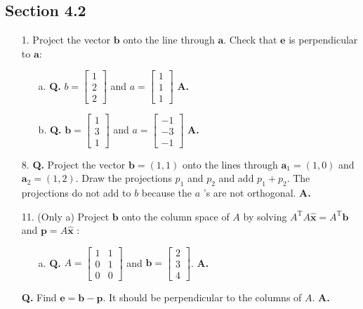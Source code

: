 \documentclass[main.tex]{subfiles}
\begin{document}
\subsection{Section 4.2}
\begin{enumerate}
    \item [1.] Project the vector $\boldsymbol{b}$ onto the line through $\boldsymbol{a}$. Check that $\boldsymbol{e}$ is perpendicular to $\boldsymbol{a}$:
    \begin{enumerate}
        \item [a.] \textbf{Q.} $b=\left[\begin{array}{l}1 \\ 2 \\ 2\end{array}\right]$ and $a=\left[\begin{array}{l}1 \\ 1 \\ 1\end{array}\right]$ \textbf{A.}
        \item [b.] \textbf{Q.} $\boldsymbol{b}=\left[\begin{array}{l}1 \\ 3 \\ 1\end{array}\right]$ and $a=\left[\begin{array}{l}-1 \\ -3 \\ -1\end{array}\right]$ \textbf{A.}
    \end{enumerate}
    
    \item [8.] \textbf{Q.} Project the vector $\boldsymbol{b}=(1,1)$ onto the lines through $\boldsymbol{a}_{1}=(1,0)$ and $\boldsymbol{a}_{2}=(1,2)$. Draw the projections $p_{1}$ and $p_{2}$ and add $p_{1}+p_{2}$. The projections do not add to $b$ because the $a$ 's are not orthogonal. \textbf{A.}
    
    \item [11.] (Only a) Project $\boldsymbol{b}$ onto the column space of $A$ by solving $A^{\mathrm{T}} A \widehat{\boldsymbol{x}}=A^{\mathrm{T}} \boldsymbol{b}$ and $\boldsymbol{p}=A \widehat{\boldsymbol{x}}$ :
    \begin{enumerate}
        \item [a.] \textbf{Q.} $A=\left[\begin{array}{ll}1 & 1 \\ 0 & 1 \\ 0 & 0\end{array}\right]$ and $\boldsymbol{b}=\left[\begin{array}{l}2 \\ 3 \\ 4\end{array}\right]$. \textbf{A.}
        
    \end{enumerate}
    \textbf{Q.} Find $\boldsymbol{e}=\boldsymbol{b}-\boldsymbol{p} .$ It should be perpendicular to the columns of $A$. \textbf{A.}
    
\end{enumerate}
\end{document}
